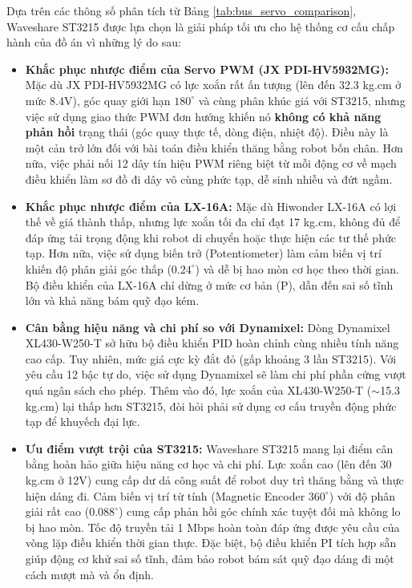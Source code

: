 Dựa trên các thông số phân tích từ Bảng \ref{tab:bus_servo_comparison}, Waveshare ST3215 được lựa chọn là giải pháp tối ưu cho hệ thống cơ cấu chấp hành của đồ án vì những lý do sau:

\begin{itemize}
    \item \textbf{Khắc phục nhược điểm của Servo PWM (JX PDI-HV5932MG):} Mặc dù JX PDI-HV5932MG có lực xoắn rất ấn tượng (lên đến 32.3 kg.cm ở mức 8.4V), góc quay giới hạn $180^{\circ}$ và cùng phân khúc giá với ST3215, nhưng việc sử dụng giao thức PWM đơn hướng khiến nó \textbf{không có khả năng phản hồi} trạng thái (góc quay thực tế, dòng điện, nhiệt độ). Điều này là một cản trở lớn đối với bài toán điều khiển thăng bằng robot bốn chân. Hơn nữa, việc phải nối 12 dây tín hiệu PWM riêng biệt từ mỗi động cơ về mạch điều khiển làm sơ đồ đi dây vô cùng phức tạp, dễ sinh nhiễu và đứt ngầm. 
    \item \textbf{Khắc phục nhược điểm của LX-16A:} Mặc dù Hiwonder LX-16A có lợi thế về giá thành thấp, nhưng lực xoắn tối đa chỉ đạt 17 kg.cm, không đủ để đáp ứng tải trọng động khi robot di chuyển hoặc thực hiện các tư thế phức tạp. Hơn nữa, việc sử dụng biến trở (Potentiometer) làm cảm biến vị trí khiến độ phân giải góc thấp ($0.24^{\circ}$) và dễ bị hao mòn cơ học theo thời gian. Bộ điều khiển của LX-16A chỉ dừng ở mức cơ bản (P), dẫn đến sai số tĩnh lớn và khả năng bám quỹ đạo kém.
    \item \textbf{Cân bằng hiệu năng và chi phí so với Dynamixel:} Dòng Dynamixel XL430-W250-T sở hữu bộ điều khiển PID hoàn chỉnh cùng nhiều tính năng cao cấp. Tuy nhiên, mức giá cực kỳ đắt đỏ (gấp khoảng 3 lần ST3215). Với yêu cầu 12 bậc tự do, việc sử dụng Dynamixel sẽ làm chi phí phần cứng vượt quá ngân sách cho phép. Thêm vào đó, lực xoắn của XL430-W250-T ($\sim$15.3 kg.cm) lại thấp hơn ST3215, đòi hỏi phải sử dụng cơ cấu truyền động phức tạp để khuyếch đại lực.
    \item \textbf{Ưu điểm vượt trội của ST3215:} Waveshare ST3215 mang lại điểm cân bằng hoàn hảo giữa hiệu năng cơ học và chi phí. Lực xoắn cao (lên đến 30 kg.cm ở 12V) cung cấp dư dả công suất để robot duy trì thăng bằng và thực hiện dáng đi. Cảm biến vị trí từ tính (Magnetic Encoder $360^{\circ}$) với độ phân giải rất cao ($0.088^{\circ}$) cung cấp phản hồi góc chính xác tuyệt đối mà không lo bị hao mòn. Tốc độ truyền tải 1 Mbps hoàn toàn đáp ứng được yêu cầu của vòng lặp điều khiển thời gian thực. Đặc biệt, bộ điều khiển PI tích hợp sẵn giúp động cơ khử sai số tĩnh, đảm bảo robot bám sát quỹ đạo dáng đi một cách mượt mà và ổn định.
\end{itemize}

